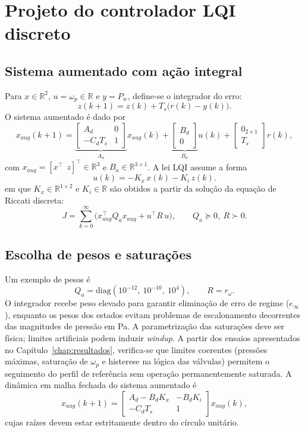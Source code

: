 \section{Projeto do controlador LQI discreto}
\label{sec:controle-lqi-discreto}
\subsection{Sistema aumentado com ação integral}
\label{sec:lqi-mimo}
Para $x\in\mathbb{R}^2$, $u=\omega_p\in\mathbb{R}$ e $y=P_w$, define-se o integrador do erro:
\[
    z(k+1)=z(k)+T_s\big(r(k)-y(k)\big).
\]
O sistema aumentado é dado por
\[
    x_{aug}(k+1)=
    \underbrace{\begin{bmatrix}
            A_d      & 0 \\
            -C_d T_s & 1
        \end{bmatrix}}_{A_a}
    x_{aug}(k)
    +
    \underbrace{\begin{bmatrix}
            B_d \\
            0
        \end{bmatrix}}_{B_a}
    u(k)
    +
    \begin{bmatrix}
        0_{2\times 1} \\
        T_s
    \end{bmatrix}r(k),
\]
com $x_{aug}=[x^\top\ \ z]^\top\in\mathbb{R}^3$ e $B_a\in\mathbb{R}^{3\times 1}$. A lei LQI assume a forma
\[
    u(k)=-K_x\,x(k)-K_i\,z(k).
\]
em que $K_x\in\mathbb{R}^{1\times 2}$ e $K_i\in\mathbb{R}$ são obtidos a partir da solução da equação de Riccati discreta:
\[
    J=\sum_{k=0}^{\infty}\big(x_{aug}^\top Q_a x_{aug}+u^\top R\,u\big),\qquad
    Q_a\succeq 0,\ R\succ 0.
\]
\subsection{Escolha de pesos e saturações}
Um exemplo de pesos é
\[
    Q_a=\mathrm{diag}(10^{-12},\ 10^{-10},\ 10^{4}),\qquad
    R=r_{\omega}.
\]
O integrador recebe peso elevado para garantir eliminação de erro de regime ($e_\infty$), enquanto os pesos dos estados evitam problemas de escalonamento decorrentes das magnitudes de pressão em Pa. A parametrização das saturações deve ser física; limites artificiais podem induzir \emph{windup}. A partir dos ensaios apresentados no Capítulo~\ref{chap:resultados}, verifica-se que limites coerentes (pressões máximas, saturação de $\omega_p$ e histerese na lógica das válvulas) permitem o seguimento do perfil de referência sem operação permanentemente saturada.
A dinâmica em malha fechada do sistema aumentado é
\[
    x_{aug}(k+1)=
    \begin{bmatrix}
        A_d - B_d K_x & - B_d K_i \\
        -C_d T_s      & 1
    \end{bmatrix}
    x_{aug}(k),
\]
cujas raízes devem estar estritamente dentro do círculo unitário.

